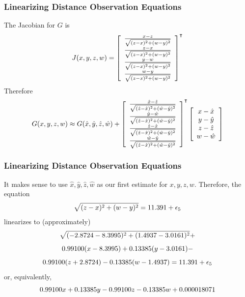 \documentclass[xcolor=dvipsnames]{beamer}
\begin{document}
\begin{frame}
  \frametitle{Linearizing Distance Observation Equations}
  The Jacobian for $G$ is
  \begin{equation}
    \label{eq:ahchaiyi}
    J(x,y,z,w)=\left[
      \begin{array}{c}
     \frac{x-z}{\sqrt{(z-x)^{2}+(w-y)^{2}}} \\
     \frac{z-x}{\sqrt{(z-x)^{2}+(w-y)^{2}}} \\
     \frac{y-w}{\sqrt{(z-x)^{2}+(w-y)^{2}}} \\
     \frac{w-y}{\sqrt{(z-x)^{2}+(w-y)^{2}}}
      \end{array}\right]^{\intercal}\notag
  \end{equation}
  Therefore
  \begin{equation}
    \label{eq:ziexowei}
    G(x,y,z,w)\approx{}G(\hat{x},\hat{y},\hat{z},\hat{w})+\left[
      \begin{array}{c}
     \frac{\hat{x}-\hat{z}}{\sqrt{(\hat{z}-\hat{x})^{2}+(\hat{w}-\hat{y})^{2}}} \\
     \frac{\hat{y}-\hat{w}}{\sqrt{(\hat{z}-\hat{x})^{2}+(\hat{w}-\hat{y})^{2}}} \\
     \frac{\hat{z}-\hat{x}}{\sqrt{(\hat{z}-\hat{x})^{2}+(\hat{w}-\hat{y})^{2}}} \\
     \frac{\hat{w}-\hat{y}}{\sqrt{(\hat{z}-\hat{x})^{2}+(\hat{w}-\hat{y})^{2}}}
      \end{array}\right]^{\intercal}\left[
      \begin{array}{c}
        x-\hat{x} \\
        y-\hat{y} \\
        z-\hat{z} \\
        w-\hat{w}
      \end{array}\right]\notag
  \end{equation}
\end{frame}

\begin{frame}
  \frametitle{Linearizing Distance Observation Equations}
  It makes sense to use $\hat{x},\hat{y},\hat{z},\hat{w}$ as our first
  estimate for $x,y,z,w$. Therefore, the equation
  \begin{equation}
    \label{eq:jahxiebo}
      \sqrt{(z-x)^{2}+(w-y)^{2}}=11.391+\epsilon_{5}\notag
  \end{equation}
  linearizes to (approximately)
  \begin{equation}
    \label{eq:dooxahru}
    \sqrt{(-2.8724-8.3995)^{2}+(1.4937-3.0161)^{2}}+\notag
  \end{equation}
  \begin{equation}
    \label{eq:eejaetab}
    0.99100(x-8.3995)+0.13385(y-3.0161)-\notag
  \end{equation}
  \begin{equation}
    \label{eq:yahziech}
    0.99100(z+2.8724)-0.13385(w-1.4937)=11.391+\epsilon_{5}\notag
  \end{equation}
  or, equivalently,
  \begin{equation}
    \label{eq:axeeteja}
    0.99100x+0.13385y-0.99100z-0.13385w+0.000018071\notag
  \end{equation}
\end{frame}
\end{document}
